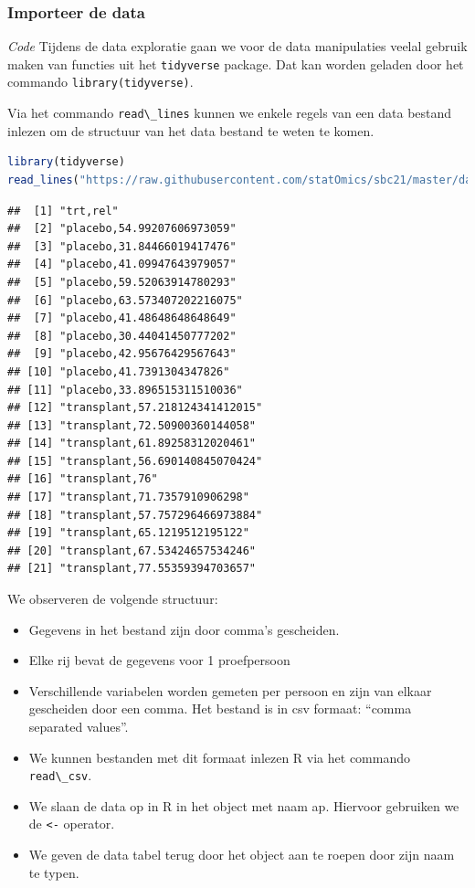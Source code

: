 \documentclass[
  12pt,dutch,coursenotes]{book}
\newcommand{\passthrough}[1]{#1}
\providecommand{\tightlist}{%
  \setlength{\itemsep}{0pt}\setlength{\parskip}{0pt}}
\begin{document}
\hypertarget{importeer-de-data}{%
\subsubsection{Importeer de data}\label{importeer-de-data}}

\emph{Code} Tijdens de data exploratie gaan we voor de data manipulaties veelal gebruik maken van functies uit het \passthrough{\lstinline!tidyverse!} package.
Dat kan worden geladen door het commando
\passthrough{\lstinline!library(tidyverse)!}.

Via het commando \passthrough{\lstinline!read\_lines!} kunnen we enkele regels van een data bestand inlezen om de structuur van het data bestand te weten te komen.

\begin{lstlisting}[language=R]
library(tidyverse)
read_lines("https://raw.githubusercontent.com/statOmics/sbc21/master/data/armpit.csv")
\end{lstlisting}

\begin{lstlisting}
##  [1] "trt,rel"                      
##  [2] "placebo,54.99207606973059"    
##  [3] "placebo,31.84466019417476"    
##  [4] "placebo,41.09947643979057"    
##  [5] "placebo,59.52063914780293"    
##  [6] "placebo,63.573407202216075"   
##  [7] "placebo,41.48648648648649"    
##  [8] "placebo,30.44041450777202"    
##  [9] "placebo,42.95676429567643"    
## [10] "placebo,41.7391304347826"     
## [11] "placebo,33.896515311510036"   
## [12] "transplant,57.218124341412015"
## [13] "transplant,72.50900360144058" 
## [14] "transplant,61.89258312020461" 
## [15] "transplant,56.690140845070424"
## [16] "transplant,76"                
## [17] "transplant,71.7357910906298"  
## [18] "transplant,57.757296466973884"
## [19] "transplant,65.1219512195122"  
## [20] "transplant,67.53424657534246" 
## [21] "transplant,77.55359394703657"
\end{lstlisting}

We observeren de volgende structuur:

\begin{itemize}
\tightlist
\item
  Gegevens in het bestand zijn door comma's gescheiden.
\item
  Elke rij bevat de gegevens voor 1 proefpersoon
\item
  Verschillende variabelen worden gemeten per persoon en zijn van elkaar gescheiden door een comma. Het bestand is in csv formaat: ``comma separated values''.
\item
  We kunnen bestanden met dit formaat inlezen R via het commando \passthrough{\lstinline!read\_csv!}.
\item
  We slaan de data op in R in het object met naam ap. Hiervoor gebruiken we de \passthrough{\lstinline!<-!} operator.
\item
  We geven de data tabel terug door het object aan te roepen door zijn naam te typen.
\end{itemize}
\end{document}
